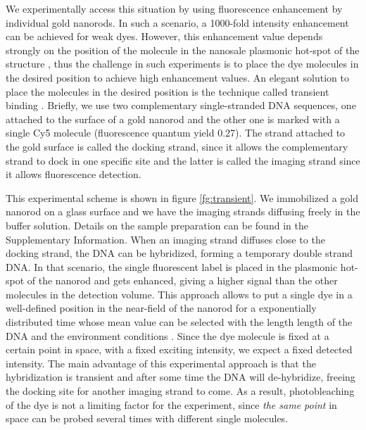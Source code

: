 We experimentally access this situation by using fluorescence enhancement
by individual gold nanorods. In such a scenario, 
a 1000-fold intensity enhancement can be achieved for weak 
dyes\cite{yuan2013thousand,khatua2014resonant}. However, this enhancement value
depends strongly on the position of the molecule in the nanosale plasmonic 
hot-spot of the structure \cite{khatua2014resonant}, thus the challenge in 
such experiments is to place the dye molecules in the desired position to 
achieve high enhancement values. An elegant solution to place the molecules 
in the desired position is the technique called transient binding \cite{acuna2012fluorescence}.
Briefly, we use two complementary single-stranded DNA sequences, one attached
 to the surface of a gold nanorod and the other one is marked with a single Cy5
 molecule (fluorescence quantum yield 0.27). The strand attached to the gold 
surface is  called the docking strand, since it allows the complementary strand 
to dock in one specific site and the latter is called the imaging strand since 
it allows fluorescence detection. 

This experimental scheme is shown in figure \ref{fg:transient}. We immobilized 
a gold nanorod on a glass surface and we have the imaging strands diffusing 
freely in the buffer solution. Details on the sample preparation can be found 
in the Supplementary Information. When an imaging strand diffuses close to the 
docking strand, the DNA can be hybridized, forming a temporary double strand DNA. 
In that scenario, the single fluorescent label is placed in the plasmonic 
hot-spot of the nanorod and gets enhanced, giving a higher signal than the 
other molecules in the detection volume. 
This approach allows to put a single dye in a well-defined position in the 
near-field of the nanorod for a exponentially distributed time whose 
mean value can be selected with the length length of the DNA and the 
environment conditions \cite{}. Since the dye molecule is fixed at a 
certain point in space, with a fixed exciting intensity, we expect a 
fixed detected intensity. The main advantage of this experimental 
approach is that the hybridization is transient and after some time 
the DNA will de-hybridize, freeing the docking site for another 
imaging strand to come. As a result, photobleaching of the dye 
is not a limiting factor for the experiment, since \textit{the same point} 
in space can be probed several times with different single molecules.

